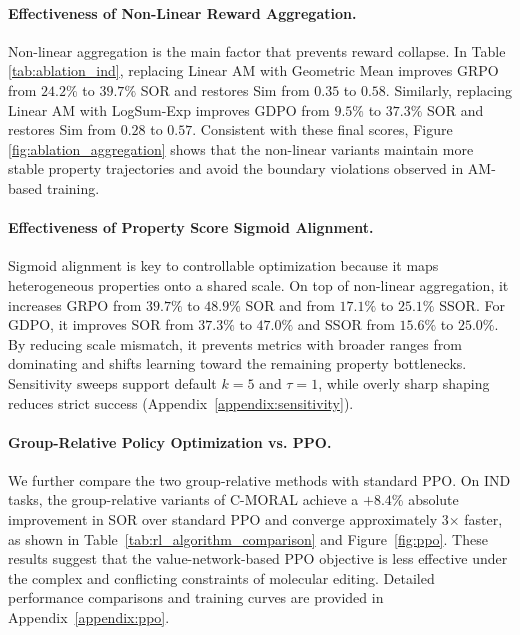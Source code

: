 \documentclass[11pt]{article}
\begin{document}
\paragraph{Effectiveness of Non-Linear Reward Aggregation.}
Non-linear aggregation is the main factor that prevents reward collapse. In Table \ref{tab:ablation_ind}, replacing Linear AM with Geometric Mean improves GRPO from $24.2\%$ to $39.7\%$ SOR and restores Sim from $0.35$ to $0.58$. Similarly, replacing Linear AM with LogSum-Exp improves GDPO from $9.5\%$ to $37.3\%$ SOR and restores Sim from $0.28$ to $0.57$. Consistent with these final scores, Figure \ref{fig:ablation_aggregation} shows that the non-linear variants maintain more stable property trajectories and avoid the boundary violations observed in AM-based training.

\paragraph{Effectiveness of Property Score Sigmoid Alignment.}
Sigmoid alignment is key to controllable optimization because it maps heterogeneous properties onto a shared scale. On top of non-linear aggregation, it increases GRPO from $39.7\%$ to \textbf{$48.9\%$} SOR and from $17.1\%$ to \textbf{$25.1\%$} SSOR. For GDPO, it improves SOR from $37.3\%$ to \underline{$47.0\%$} and SSOR from $15.6\%$ to \underline{$25.0\%$}. By reducing
scale mismatch, it prevents metrics with broader ranges from dominating and shifts learning toward
the remaining property bottlenecks. Sensitivity sweeps support default $k=5$ and $\tau=1$, while overly sharp shaping reduces strict success (Appendix~\ref{appendix:sensitivity}).

\paragraph{Group-Relative Policy Optimization vs. PPO.}
We further compare the two group-relative methods with standard PPO. 
On IND tasks, the group-relative variants of \textsc{C-MORAL} achieve a $+8.4$\% absolute improvement in SOR over standard PPO and converge approximately 3$\times$ faster, as shown in Table~\ref{tab:rl_algorithm_comparison} and Figure~\ref{fig:ppo}. 
These results suggest that the value-network-based PPO objective is less effective under the complex and conflicting constraints of molecular editing. Detailed performance comparisons and training curves are provided in Appendix~\ref{appendix:ppo}.

\end{document}
